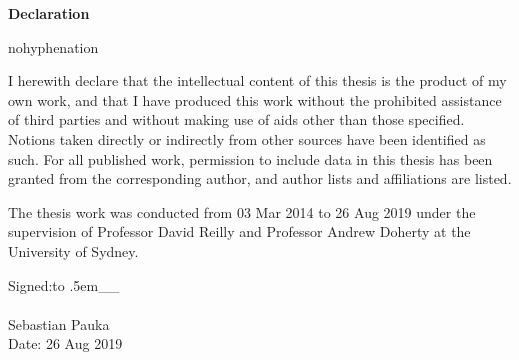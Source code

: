 {}

\bgroup
\LARGE \bf \centering Declaration \\
\egroup

\begin{center}
\begin{minipage}[c]{0.75\textwidth}
\begin{hyphenrules}{nohyphenation}
\begin{onehalfspace}
    \vspace{2em}
    I herewith declare that the intellectual content of this thesis is the product of my own work, and that I have produced this work without the prohibited assistance of third parties and without making use of aids other than those specified. Notions taken directly or indirectly from other sources have been identified as such. For all published work, permission to include data in this thesis has been granted from the corresponding author, and author lists and affiliations are listed.

    \vspace{1em}
    The thesis work was conducted from 03 Mar 2014 to 26 Aug 2019 under the supervision of Professor David Reilly and Professor Andrew Doherty at the University of Sydney.

    \def\dashsign{\xleaders\hbox to .5em{\_}\hfill\_}
    \vspace{5em}
    \hspace*{0mm}Signed:\vspace{2pt}\dashsign\\
    \vspace{1em} \\
    \hspace*{0mm}\phantom{Signed: }Sebastian Pauka\\
    \hspace*{0mm}\phantom{Signed: }Date: 26 Aug 2019
\end{onehalfspace}
\end{hyphenrules}
\end{minipage}
\end{center}
